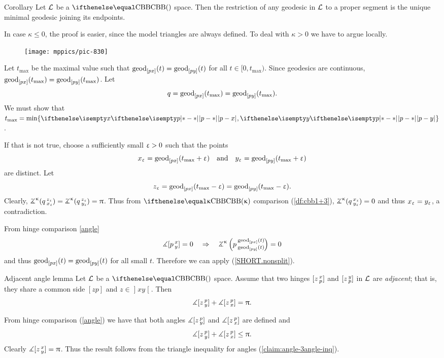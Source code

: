 \begin{thm}{Corollary}\label{cor:unique-geod-cbb}
Let $\mathcal{L}$ be a $\Alex{}$ space.
Then the restriction of any geodesic in $\mathcal{L}$ to a proper segment is the unique minimal geodesic joining its endpoints.
\end{thm}

In case $\kappa\le 0$, the proof is easier, since the model triangles are always defined.
To deal with $\kappa>0$ we have to argue locally.

\begin{wrapfigure}{r}{25 mm}
\vskip-0mm
\centering
\texttt{[image: mppics/pic-830]}
\end{wrapfigure}

Let $t_{\max}$ be the maximal value 
such that $\mathrm{geod}_{[p x]}(t)=\mathrm{geod}_{[p y]}(t)$ for all $t\in [0,t_{\max})$.
Since geodesics are continuous, $\geod_{[p x]}(t_{\max})\z=\geod_{[p y]}(t_{\max})$.
Let
\[q=\geod_{[p x]}(t_{\max})\z=\geod_{[p y]}(t_{\max}).\]
We must show that $t_{\max}=\min\{\dist{p}{x}{},\dist{p}{y}{}\}$.

If that is not true, choose a sufficiently small $\upvarepsilon>0$ such that the  points
\[x_\upvarepsilon=\mathrm{geod}_{[p x]}(t_{\max}+\upvarepsilon)\quad 
\text{and}\quad  
  y_\upvarepsilon=\mathrm{geod}_{[p y]}(t_{\max}+\upvarepsilon)\] 
are distinct.
Let
\[z_\upvarepsilon=\mathrm{geod}_{[p x]}(t_{\max}-\upvarepsilon)
=\mathrm{geod}_{[p y]}(t_{\max}-\upvarepsilon).\]
Clearly, $\angk\kappa q{z_\eps}{x_\eps}=\angk\kappa q{z_\eps}{y_\eps}=\pi$.
Thus from $\Alex\kappa$ comparison (\ref{df:cbb1+3}), $\angk\kappa q{x_\eps}{y_\eps}=0$ and thus $x_\upvarepsilon=y_\upvarepsilon$, a contradiction.

\parit{(\ref{SHORT.angle=0})} From hinge comparison \ref{angle} 
\[\mangle\hinge p x y=0\quad \Rightarrow\quad \angkk\kappa p{\geod_{[p x]}(t)}{\geod_{[p y]}(t)}=0\] 
and thus ${\mathrm{geod}_{[p x]}(t)}={\mathrm{geod}_{[p y]}(t)}$ for all small $t$. 
Therefore we can apply (\ref{SHORT.nonsplit}).
\qeds

\begin{thm}{Adjacent angle lemma}\label{lem:sum=pi}
Let $\mathcal{L}$ be a $\Alex{}$ space.
Assume that two hinges $[z\,{}^{x}_{p}]$ and $[z\,{}^{y}_{p}]$ in $\mathcal{L}$ are \emph{adjacent}; that is, they share a common side $[zp]$ and $z\in\mathopen{]}xy\mathclose{[}$.
Then 
\[\measuredangle[z\,{}^{p}_{y}] + \measuredangle[z\,{}^{p}_{x}]=\uppi. \]

\end{thm}

From hinge comparison (\ref{angle}) we have that both angles 
$\measuredangle[z\,{}^{p}_{y}]$ and $\measuredangle[z\,{}^{p}_{x}]$ are defined and 
\[\mangle\hinge z p y + \mangle\hinge z p x\le\pi.\]
Clearly $\measuredangle[z\,{}^{x}_{y}]=\uppi$.
Thus the result follows from the triangle inequality for angles (\ref{claim:angle-3angle-inq}).
\qeds


